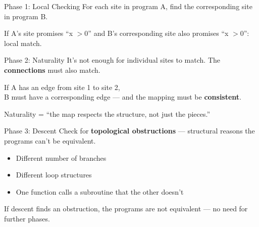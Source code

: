 \documentclass[aspectratio=169,10pt]{beamer}
\newcommand{\hint}[1]{\begin{center}
  \colorbox{hintbg}{\parbox{0.88\textwidth}{\centering\small #1}}\end{center}}
\begin{document}
\begin{frame}{Phase 1: Local Checking}
For each site in program A, find the corresponding site in program B.
\vspace{0.5em}
\begin{center}
\end{center}
\vspace{0.3em}
If A's site promises ``x $> 0$'' and B's corresponding site also promises ``x $> 0$'': local match.
\end{frame}

\begin{frame}{Phase 2: Naturality}
It's not enough for individual sites to match. The \textbf{connections} must also match.
\vspace{0.3em}
\begin{center}
If A has an edge from site 1 to site 2,\\
B must have a corresponding edge --- and the mapping must be \textbf{consistent}.
\end{center}
\vspace{0.3em}
\hint{Naturality = ``the map respects the structure, not just the pieces.''}
\end{frame}

\begin{frame}{Phase 3: Descent}
Check for \textbf{topological obstructions} --- structural reasons the programs can't be equivalent.
\vspace{0.3em}
\begin{itemize}
  \item Different number of branches
  \item Different loop structures
  \item One function calls a subroutine that the other doesn't
\end{itemize}
\vspace{0.3em}
If descent finds an obstruction, the programs are \textcolor{danger}{not equivalent} --- no need for further phases.
\end{frame}
\end{document}
